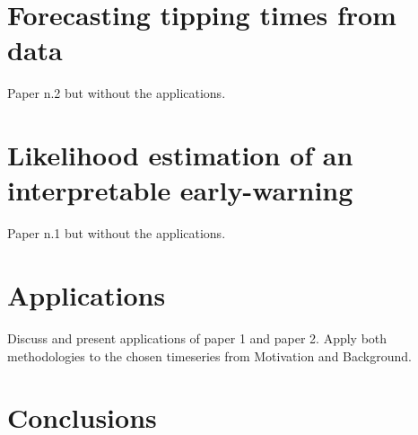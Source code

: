 \documentclass[a4paper,12pt,print]{style}
\begin{document}
\chapter{Forecasting tipping times from data}\label{sec:forecasting}
Paper n.2 but without the applications.

\chapter{Likelihood estimation of an interpretable early-warning}\label{sec:interpretable}
Paper n.1 but without the applications.

\chapter{Applications}\label{sec:applications}
Discuss and present applications of paper 1 and paper 2.
Apply both methodologies to the chosen timeseries from Motivation and Background.

\chapter{Conclusions}\label{sec:conclusions}

\backmatter
\printbibliography[heading=bibintoc]
\end{document}
